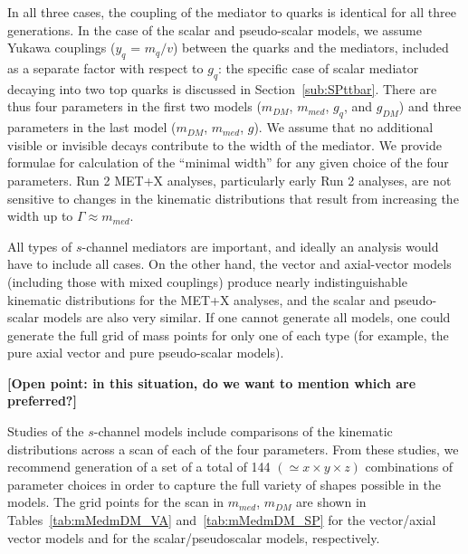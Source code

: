 \documentclass[debug,notitlepage]{dmfm}
\newcommand{\mdm}{\ensuremath{m_{DM}}\xspace}
\begin{document}
In all three cases, the coupling of the mediator to quarks is
identical for all three generations. In the case of the scalar and
pseudo-scalar models, we assume Yukawa couplings ($y_q$ = $m_q/v$)
between the quarks and the
mediators, included as a separate factor with respect to $g_q$:
the specific case of scalar mediator decaying into two top quarks 
is discussed in Section~\ref{sub:SPttbar}. 
There are thus four parameters in the first two
models (\mdm, $m_{med}$, $g_q$, and $g_{DM}$) and three parameters
in the last model (\mdm, $m_{med}$, $g$). We assume that no
additional visible or invisible decays contribute to the width of the
mediator. We provide formulae for calculation of the ``minimal
width'' for any given choice of the four parameters. Run 2 MET+X
analyses, particularly early Run 2 analyses, are not sensitive to
changes in the kinematic distributions that result from increasing the
width up to $\Gamma \approx m_{med}$.

All types of $s$-channel mediators are important, and ideally an analysis 
would have to include all cases. On the other hand, the vector and axial-vector models 
(including those with mixed couplings) produce nearly indistinguishable kinematic distributions 
for the MET+X analyses, and the scalar and pseudo-scalar models are also very similar. 
If one cannot generate all models, one could generate the full grid of mass points for only one of each 
type (for example, the pure axial vector and pure pseudo-scalar models). 

\textbf{[Open point: in this situation, do we want to mention which are
    preferred?]}

Studies of the $s$-channel models include comparisons of the kinematic
distributions across a scan of each of the four parameters. From these
studies, we recommend generation of a set of a total of 144
$(\simeq x\times y\times z)$ 
combinations of parameter choices in order to capture the full variety
of shapes possible in the models.
The grid points for the scan in $m_{med}$, \mdm are shown in
Tables~\ref{tab:mMedmDM_VA} and~\ref{tab:mMedmDM_SP} 
for the vector/axial vector models and for the scalar/pseudoscalar models,
respectively. 
\end{document}
